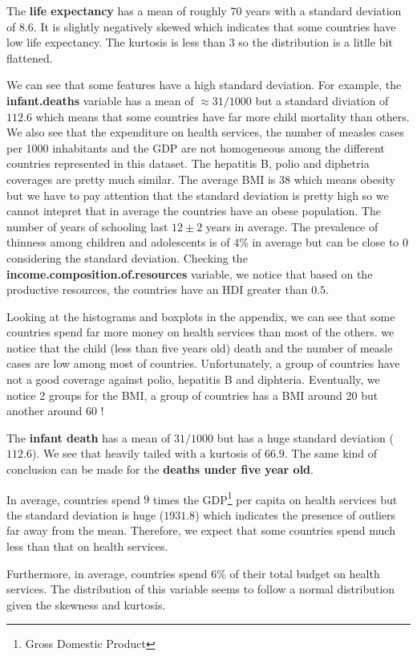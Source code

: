 The \textbf{life expectancy} has a mean of roughly $70$ years with a standard deviation of $8.6$. It is slightly negatively skewed which indicates that some countries have low life expectancy. The kurtosis is less than $3$ so the distribution is a litlle bit flattened.

We can see that some features have a high standard deviation. For example, the \textbf{infant.deaths} variable has a mean of $\approx 31 / 1000$ but a standard diviation of $112.6$ which means that some countries have far more child mortality than others. We also see that the expenditure on health services, the number of measles cases per 1000 inhabitants and the GDP are not homogeneous among the different countries represented in this dataset. The hepatitis B, polio and diphetria coverages are pretty much similar. The average BMI is $38$ which means obesity but we have to pay attention that the standard deviation is pretty high so we cannot intepret that in average the countries have an obese population. The number of years of schooling last $12 \pm 2$ years in average. The prevalence of thinness among children and adolescents is of $4\%$ in average but can be close to $0$ considering the standard deviation. Checking the \textbf{income.composition.of.resources} variable, we notice that based on the productive resources, the countries have an HDI greater than $0.5$.

Looking at the histograms and boxplots in the appendix, we can see that some countries spend far more money on health services than most of the others. we notice that the child (less than five years old) death and the number of measle cases are low among most of countries. Unfortunately, a group of countries have not a good coverage against polio, hepatitis B and diphteria. Eventually, we notice 2 groups for the BMI, a group of countries has a BMI around 20 but another around 60 !


The \textbf{infant death} has a mean of $31 / 1000$ but has a huge standard deviation ($112.6$). We see that heavily tailed with a kurtosis of $66.9$. The same kind of conclusion can be made for the \textbf{deaths under five year old}.

In average, countries spend $9$ times the GDP\footnote{Gross Domestic Product} per capita on health services but the standard deviation is huge ($1931.8$) which indicates the presence of outliers far away from the mean. Therefore, we expect that some countries spend much less than that on health services.

Furthermore, in average, countries spend $6 \%$ of their total budget on health services. The distribution of this variable seems to follow a normal distribution given the skewness and kurtosis.

